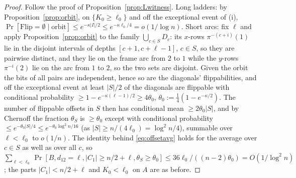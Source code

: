 \begin{proof}
Follow the proof of Proposition~\ref{prop:Lwitness}.  Long ladders:
by Proposition~\ref{prop:orbit}, on $\{K_0\ge\ell_0\}$ and off the
exceptional event of (i),
$\Pr[\mathrm{Flip}=\emptyset\mid\text{orbit}]\le e^{-\kappa|I|/2}\le
e^{-\kappa\ell_0/4}=o(1/\log n)$.  Short arcs: fix $\ell$ and apply
Proposition~\ref{prop:orbit} to the family
$\bigcup_{c\in S}D_c$: its $x$-rows $\pi^{-(c+i)}(1)$ lie in the
disjoint intervals of depths $[c+1,c+\ell-1]$, $c\in S$, so they are
pairwise distinct, and they lie on the frame arc from $2$ to $1$ while
the $y$-rows $\pi^{-i}(2)$ lie on the arc from $1$ to $2$, so the two
sets are disjoint.  Given the orbit the bits of all pairs are
independent, hence so are the diagonals' flippabilities, and off the
exceptional event at least $|S|/2$ of the diagonals are flippable with
conditional probability $\ge1-e^{-\kappa(\ell-1)/2}\ge4\theta_0$,
$\theta_0:=\tfrac14(1-e^{-\kappa/2})$.  The number of flippable
offsets in $S$ then has conditional mean $\ge2\theta_0|S|$, and by
Chernoff the fraction $\theta_S$ is $\ge\theta_0$ except with
conditional probability $\le e^{-\theta_0|S|/4}\le
e^{-\theta_0\log^2n/16}$ (as $|S|\ge n/(4\ell_0)=\log^2n/4$),
summable over $\ell<\ell_0$ to $o(1/n)$.  The identity behind \eqref{eq:offsetavg}
holds for the average over $c\in S$ as well as over all $c$, so
$\sum_{\ell<\ell_0}\Pr[B,d_{12}=\ell,|C_1|\ge n/2+\ell,\theta_S\ge\theta_0]
\le36\ell_0/((n-2)\theta_0)=O(1/\log^2n)$; the parts $|C_1|<n/2+\ell$
and $K_0<\ell_0$ on $A$ are as before.
\end{proof}

